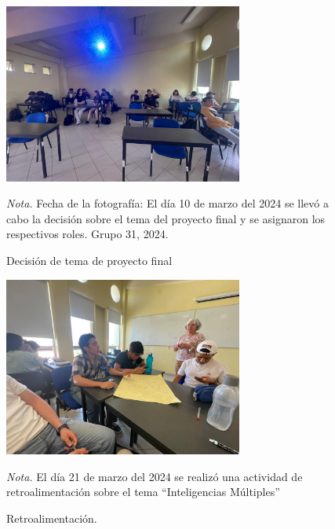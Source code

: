 \begin{figure}
    \caption{Decisi\'on de tema de proyecto final\label{fig:No.1}}
    \includegraphics[width=0.7\textwidth]{./assets/img/imagen2DH.jpeg}

	\textit{Nota.} Fecha de la fotograf\'ia: El d\'ia 10 de marzo del 2024 se llev\'o a cabo la decisi\'on sobre el tema del proyecto final y se asignaron los respectivos roles. Grupo 31, 2024.
\end{figure}

\begin{figure}
    \caption{Retroalimentaci\'on.\label{fig:No.2}}
    \includegraphics[width=0.7\textwidth]{./assets/img/imagen1DH.jpeg}

	\textit{Nota.} El d\'ia 21 de marzo del 2024 se realiz\'o una actividad de retroalimentaci\'on sobre el tema ``Inteligencias M\'ultiples''
\end{figure}

